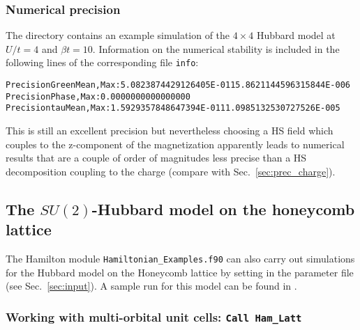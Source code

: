 \subsubsection{Numerical precision}\label{sec:prec_spin}
The directory   contains an example simulation of the $4 \times 4$ Hubbard model at $U/t=4$ and $\beta t = 10$. 
Information on the numerical stability is included in the following lines of the corresponding file \texttt{info}:
 \begin{alltt}
Precision Green  Mean, Max :    5.0823874429126405E-011   5.8621144596315844E-006
Precision Phase, Max       :    0.0000000000000000     
Precision tau    Mean, Max :    1.5929357848647394E-011   1.0985132530727526E-005 
\end{alltt}

This is still an excellent precision but nevertheless choosing a 
 HS field which couples to the z-component of the magnetization apparently leads to numerical results that are 
a couple of order of magnitudes less precise than a HS decomposition coupling to the charge (compare with Sec.~\ref{sec:prec_charge}).

    

\subsection{The $SU(2)$-Hubbard model on  the honeycomb  lattice}\label{sec:walk1.2}

The Hamilton module \texttt{Hamiltonian\_Examples.f90}   can also carry out simulations for the Hubbard model on the Honeycomb lattice by setting in the parameter file    (see Sec.~\ref{sec:input}).
 A sample run for this model can be found in .

\subsubsection{Working with multi-orbital unit cells:  \texttt{Call Ham\_Latt} } \label{sec:multi-orbital}

